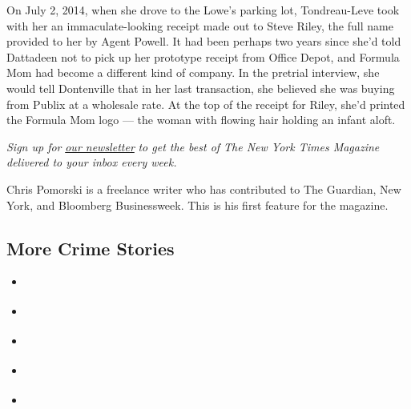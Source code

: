 On July 2, 2014, when she drove to the Lowe's parking lot, Tondreau-Leve
took with her an immaculate-looking receipt made out to Steve Riley, the
full name provided to her by Agent Powell. It had been perhaps two years
since she'd told Dattadeen not to pick up her prototype receipt from
Office Depot, and Formula Mom had become a different kind of company. In
the pretrial interview, she would tell Dontenville that in her last
transaction, she believed she was buying from Publix at a wholesale
rate. At the top of the receipt for Riley, she'd printed the Formula Mom
logo --- the woman with flowing hair holding an infant aloft.

\emph{Sign up for}
\href{http://www.nytimes3xbfgragh.onion/newsletters/magazine}{\emph{our
newsletter}} \emph{to get the best of The New York Times Magazine
delivered to your inbox every week.}

Chris Pomorski is a freelance writer who has contributed to The
Guardian, New York, and Bloomberg Businessweek. This is his first
feature for the magazine.

\hypertarget{more-crime-stories}{%
\subsection{More Crime Stories}\label{more-crime-stories}}

\begin{itemize}
\tightlist
\item
  \href{https://www.nytimes3xbfgragh.onion/interactive/2018/05/02/magazine/money-issue-baby-formula-crime-ring.html?action=click\&module=MagazineModule\&pgtype=Article\&contentCollection=Magazine\&region=Footer}{}
\item
  \href{https://www.nytimes3xbfgragh.onion/interactive/2018/05/02/magazine/money-issue-insys-opioids-kickbacks.html?action=click\&module=MagazineModule\&pgtype=Article\&contentCollection=Magazine\&region=Footer}{}
\item
  \href{https://www.nytimes3xbfgragh.onion/interactive/2018/05/03/magazine/money-issue-bangladesh-billion-dollar-bank-heist.html?action=click\&module=MagazineModule\&pgtype=Article\&contentCollection=Magazine\&region=Footer}{}
\item
  \href{https://www.nytimes3xbfgragh.onion/interactive/2018/05/03/magazine/money-issue-iowa-lottery-fraud-mystery.html?action=click\&module=MagazineModule\&pgtype=Article\&contentCollection=Magazine\&region=Footer}{}
\item
  \href{https://www.nytimes3xbfgragh.onion/interactive/2018/05/03/magazine/money-issue-white-collar-crimes-cheat-sheet.html?action=click\&module=MagazineModule\&pgtype=Article\&contentCollection=Magazine\&region=Footer}{}
\end{itemize}

